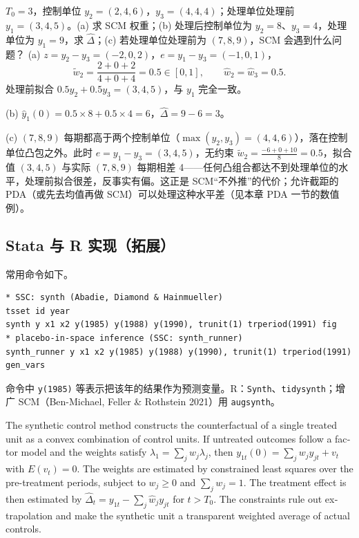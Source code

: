\begin{prac}
$T_0=3$，控制单位 $y_2=(2,4,6)$，$y_3=(4,4,4)$；处理单位处理前 $y_1=(3,4,5)$。(a) 求 SCM 权重；(b) 处理后控制单位为 $y_2=8$、$y_3=4$，处理单位为 $y_1=9$，求 $\hat\Delta$；(c) 若处理单位处理前为 $(7,8,9)$，SCM 会遇到什么问题？
\answer
(a) $z=y_2-y_3=(-2,0,2)$，$e=y_1-y_3=(-1,0,1)$，
\[
\tilde w_2=\frac{2+0+2}{4+0+4}=0.5\in[0,1],\qquad \hat w_2=\hat w_3=0.5 .
\]
处理前拟合 $0.5y_2+0.5y_3=(3,4,5)$，与 $y_1$ 完全一致。

(b) $\hat y_1(0)=0.5\times8+0.5\times4=6$，$\hat\Delta=9-6=3$。

(c) $(7,8,9)$ 每期都高于两个控制单位（$\max(y_2,y_3)=(4,4,6)$），落在控制单位凸包之外。此时 $e=y_1-y_3=(3,4,5)$，无约束 $\tilde w_2=\frac{-6+0+10}{8}=0.5$，拟合值 $(3,4,5)$ 与实际 $(7,8,9)$ 每期相差 4——任何凸组合都达不到处理单位的水平，处理前拟合很差，反事实有偏。这正是 SCM“不外推”的代价；允许截距的 PDA（或先去均值再做 SCM）可以处理这种水平差（见本章 PDA 一节的数值例）。
\end{prac}

\subsection{Stata 与 R 实现（拓展）}

常用命令如下。
\begin{lstlisting}
* SSC: synth (Abadie, Diamond & Hainmueller)
tsset id year
synth y x1 x2 y(1985) y(1988) y(1990), trunit(1) trperiod(1991) fig
* placebo-in-space inference (SSC: synth_runner)
synth_runner y x1 x2 y(1985) y(1988) y(1990), trunit(1) trperiod(1991) gen_vars
\end{lstlisting}
命令中 \texttt{y(1985)} 等表示把该年的结果作为预测变量。R：\texttt{Synth}、\texttt{tidysynth}；增广 SCM（Ben-Michael, Feller \& Rothstein 2021）用 \texttt{augsynth}。

\begin{english}
The synthetic control method constructs the counterfactual of a single treated unit as a convex combination of control units. If untreated outcomes follow a factor model and the weights satisfy $\lambda_1=\sum_j w_j\lambda_j$, then $y_{1t}(0)=\sum_j w_jy_{jt}+v_t$ with $E(v_t)=0$. The weights are estimated by constrained least squares over the pre-treatment periods, subject to $w_j\ge0$ and $\sum_j w_j=1$. The treatment effect is then estimated by $\hat\Delta_t=y_{1t}-\sum_j\hat w_jy_{jt}$ for $t>T_0$. The constraints rule out extrapolation and make the synthetic unit a transparent weighted average of actual controls.
\end{english}

